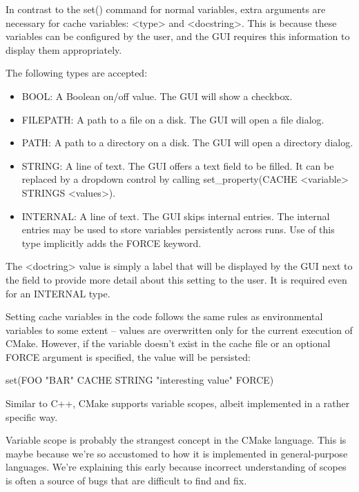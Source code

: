 In contrast to the set() command for normal variables, extra arguments are necessary for cache variables: <type> and <docstring>. This is because these variables can be configured by the user, and the GUI requires this information to display them appropriately.

The following types are accepted:

\begin{itemize}
\item
BOOL: A Boolean on/off value. The GUI will show a checkbox.

\item
FILEPATH: A path to a file on a disk. The GUI will open a file dialog.

\item
PATH: A path to a directory on a disk. The GUI will open a directory dialog.

\item
STRING: A line of text. The GUI offers a text field to be filled. It can be replaced by a dropdown control by calling set\_property(CACHE <variable> STRINGS <values>).

\item
INTERNAL: A line of text. The GUI skips internal entries. The internal entries may be used to store variables persistently across runs. Use of this type implicitly adds the FORCE keyword.
\end{itemize}

The <doctring> value is simply a label that will be displayed by the GUI next to the field to provide more detail about this setting to the user. It is required even for an INTERNAL type.

Setting cache variables in the code follows the same rules as environmental variables to some extent – values are overwritten only for the current execution of CMake. However, if the variable doesn’t exist in the cache file or an optional FORCE argument is specified, the value will be persisted:

\begin{cmake}
set(FOO "BAR" CACHE STRING "interesting value" FORCE)
\end{cmake}

Similar to C++, CMake supports variable scopes, albeit implemented in a rather specific way.


Variable scope is probably the strangest concept in the CMake language. This is maybe because we’re so accustomed to how it is implemented in general-purpose languages. We’re explaining this early because incorrect understanding of scopes is often a source of bugs that are difficult to find and fix.

